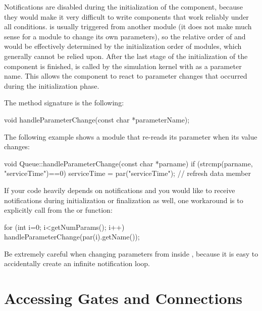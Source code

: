 \begin{note}
  Notifications are disabled during the initialization of the component,
  because they would make it very difficult to write components
  that work reliably under all conditions.
   is usually triggered from another
  module (it does not make much sense for a module to change
  its own parameters), so the relative order of
   and 
  would be effectively determined by the initialization order
  of modules, which generally cannot be relied upon. After the last
  stage of the initialization of the component is finished,
   is called by the simulation kernel
  with  as a parameter name. This allows the component
  to react to parameter changes that occurred during the initialization phase.
\end{note}

The method signature is the following:

\begin{cpp}
void handleParameterChange(const char *parameterName);
\end{cpp}

The following example shows a module that re-reads
its  parameter when its value changes:

\begin{cpp}
void Queue::handleParameterChange(const char *parname)
{
    if (strcmp(parname, "serviceTime")==0)
        serviceTime = par("serviceTime"); // refresh data member
}
\end{cpp}

If your code heavily depends on notifications and you would like to
receive notifications during initialization or finalization as well, one
workaround is to explicitly call 
from the  or  function:

\begin{cpp}
for (int i=0; i<getNumParams(); i++)
    handleParameterChange(par(i).getName());
\end{cpp}

\begin{note}
  Be extremely careful when changing parameters from inside
  , because it is easy to accidentally
  create an infinite notification loop.
\end{note}


\section{Accessing Gates and Connections}
\label{sec:simple-modules:gates}

